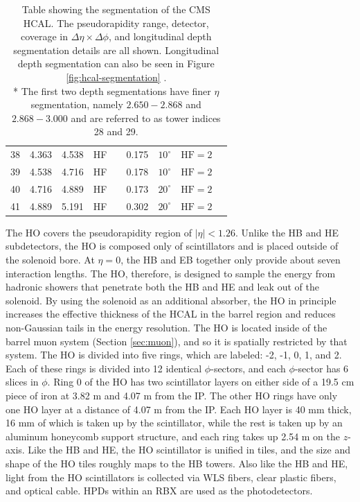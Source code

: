 \begin{table}
\begin{tabular}{r|c|c|cc|c|c|cc}
    38 & 4.363 & 4.538 & HF  &    & 0.175 & $10^{\circ}$ & $\text{HF} = 2$  & \\
    39 & 4.538 & 4.716 & HF  &    & 0.178 & $10^{\circ}$ & $\text{HF} = 2$  & \\
    40 & 4.716 & 4.889 & HF  &    & 0.173 & $20^{\circ}$ & $\text{HF} = 2$  & \\
    41 & 4.889 & 5.191 & HF  &    & 0.302 & $20^{\circ}$ & $\text{HF} = 2$  & \\
  \end{tabular}
  \caption{Table showing the segmentation of the CMS HCAL.
    The pseudorapidity range, detector, coverage in $\Delta\eta\times\Delta\phi$,
    and longitudinal depth segmentation details are all shown. Longitudinal 
depth segmentation can also be seen in Figure \ref{fig:hcal-segmentation} \cite{hcal-geometry}. \\ 
    * The first two depth segmentations have finer $\eta$ segmentation, namely 
    $2.650-2.868$ and $2.868-3.000$ and are referred to as tower indices 28 and 29.}
  \label{tab:hcal-segmentation}
\end{table}  

The HO covers the pseudorapidity region of $|\eta| < 1.26$.
Unlike the HB and HE subdetectors, the HO is composed 
only of scintillators and is placed outside of the solenoid bore.
At $\eta = 0$, the HB and EB together only provide about seven interaction
lengths.  The HO, therefore, is designed to sample the energy
from hadronic showers that penetrate both the HB and HE and leak out 
of the solenoid.  By using the solenoid as an additional absorber,
the HO in principle increases the effective thickness of the HCAL in 
the barrel region and reduces non-Gaussian tails in the energy
resolution.  The HO is located inside of the barrel muon system
(Section \ref{sec:muon}), and so it is spatially restricted by that system.
The HO is divided into five rings, which are labeled: -2, -1, 0, 1, and 2.
Each of these rings is divided into 12 identical $\phi$-sectors, and each $\phi$-sector
has 6 slices in $\phi$.
Ring 0 of the HO has two scintillator layers on either side of a 19.5 cm 
piece of iron at 3.82 m and 4.07 m from the IP.  The other HO rings 
have only one HO layer at a distance of 4.07 m from the IP.
Each HO layer is 40 mm thick, 16 mm of which is taken up by the scintillator,
while the rest is taken up by an aluminum honeycomb support structure, and each
ring takes up 2.54 m on the $z$-axis.
Like the HB and HE, the HO scintillator is unified in tiles, and the size 
and shape of the HO tiles roughly maps to the HB towers.
Also like the HB and HE, light from the HO scintillators is collected via
WLS fibers, clear plastic fibers, and optical cable.
HPDs within an RBX are used as the photodetectors.

